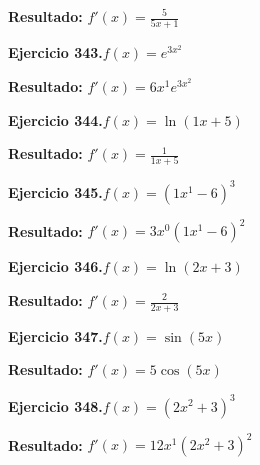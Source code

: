 \documentclass[10pt,a4paper]{article}
\begin{document}
\begin{solbox}
\textbf{Resultado:} \(\displaystyle f'(x) = \frac{5}{5x + 1}\)
\end{solbox}

\newpage
\begin{ejbox}
\textbf{Ejercicio 343.}\quad $f(x) = e^{3x^{2}}$
\end{ejbox}

\begin{solbox}
\textbf{Resultado:} \(\displaystyle f'(x) = 6x^{1}e^{3x^{2}}\)
\end{solbox}

\begin{ejbox}
\textbf{Ejercicio 344.}\quad $f(x) = \ln(1x + 5)$
\end{ejbox}

\begin{solbox}
\textbf{Resultado:} \(\displaystyle f'(x) = \frac{1}{1x + 5}\)
\end{solbox}

\begin{ejbox}
\textbf{Ejercicio 345.}\quad $f(x) = (1x^{1} -6)^{3}$
\end{ejbox}

\begin{solbox}
\textbf{Resultado:} \(\displaystyle f'(x) = 3x^{0}(1x^{1} -6)^{2}\)
\end{solbox}

\newpage
\begin{ejbox}
\textbf{Ejercicio 346.}\quad $f(x) = \ln(2x + 3)$
\end{ejbox}

\begin{solbox}
\textbf{Resultado:} \(\displaystyle f'(x) = \frac{2}{2x + 3}\)
\end{solbox}

\begin{ejbox}
\textbf{Ejercicio 347.}\quad $f(x) = \sin(5x)$
\end{ejbox}

\begin{solbox}
\textbf{Resultado:} \(\displaystyle f'(x) = 5\cos(5x)\)
\end{solbox}

\begin{ejbox}
\textbf{Ejercicio 348.}\quad $f(x) = (2x^{2} +3)^{3}$
\end{ejbox}

\begin{solbox}
\textbf{Resultado:} \(\displaystyle f'(x) = 12x^{1}(2x^{2} +3)^{2}\)
\end{solbox}
\end{document}
